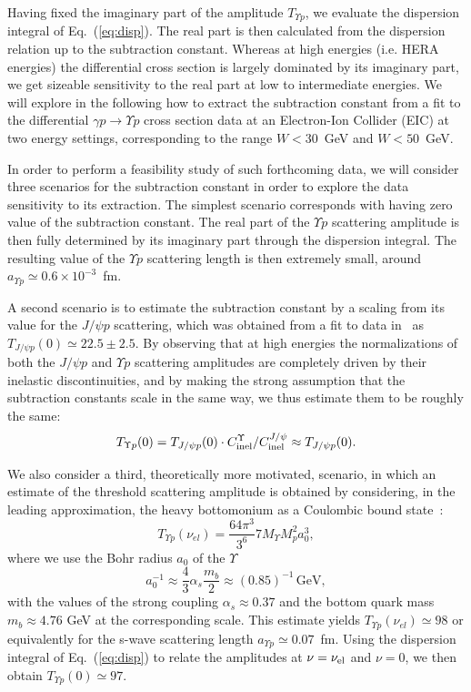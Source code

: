 \documentclass[10pt,prd,aps,nofootinbib,superscriptaddress]{revtex4}
\newcommand{\beq}{\begin{equation}}
\newcommand{\eeq}{\end{equation}}
\begin{document}
Having fixed the imaginary part of the amplitude $T_{\Upsilon p}$, we evaluate the dispersion integral of Eq.~(\ref{eq:disp}). 
The real part is then calculated from the dispersion relation up to the subtraction constant. 
Whereas at high energies (i.e. HERA energies) the differential cross section is largely dominated by its imaginary part, we get sizeable sensitivity to the real part at low to intermediate energies. We will explore in the following how to extract the subtraction constant from a fit to the 
 differential $\gamma p \to \Upsilon p$ cross section data at an Electron-Ion Collider (EIC) at two energy settings, corresponding to the range $W < 30$~GeV and $W < 50$~GeV.    

In order to perform a feasibility study of such forthcoming data, we will consider three scenarios for the subtraction constant in order to 
explore the data sensitivity to its extraction. 
The simplest scenario corresponds with having zero value of the subtraction constant. The real part of the $\Upsilon p$ scattering amplitude is then fully determined by its imaginary part through the dispersion integral. The resulting value of the $\Upsilon p$ scattering length is then extremely small, around $a_{\Upsilon p} \simeq 0.6 \times 10^{-3}$~fm. 

A second scenario is to estimate the subtraction constant by a scaling from its value for the $J/\psi p$ scattering, which was obtained from a fit to data in~\cite{Gryniuk:2016mpk} as $T_{J/\psi p }(0) \simeq 22.5 \pm 2.5$. 
By observing that at high energies the normalizations of both the $J/\psi p$ and $\Upsilon p$ scattering amplitudes are completely driven by their inelastic discontinuities, and by making the strong assumption that the subtraction constants scale in the same way, %
we thus estimate them to be roughly the same:
\beq
T_{\Upsilon p}(0) = T_{J/\psi p }(0) \cdot C_{\rm inel}^\Upsilon / C_{\rm inel}^{J/\psi} \approx T_{J/\psi p }(0).
\eeq

We also consider a third, theoretically more motivated, scenario, in which an estimate of the threshold scattering amplitude 
is obtained by considering, in the leading approximation,  the heavy bottomonium 
as a Coulombic bound state~\cite{Peskin:1979va, Kaidalov:1992hd}:
\beq
T_{\Upsilon p}(\nu_{el}) = \frac{64\pi^3}{3^6}7 M_{\Upsilon} M_p^2 a_0^3 ,
\eeq
where we use the Bohr radius $a_0$ of the $\Upsilon$
\beq
a_0^{-1} \approx \frac{4}{3}\alpha_s \frac{m_b}{2} \approx (0.85)^{-1} \,\mathrm{GeV},
\eeq
with the values of the strong coupling $\alpha_s\approx 0.37$ and the bottom quark mass $m_b\approx 4.76$ GeV at the corresponding scale.
This estimate yields $T_{\Upsilon p}(\nu_{el}) \simeq 98$ or equivalently for the s-wave scattering length $a_{\Upsilon p} \simeq 0.07$~fm. Using the dispersion integral of Eq.~(\ref{eq:disp}) to relate the amplitudes at $\nu = \nu_{\rm el}$ and $\nu = 0$, we then obtain 
$T_{\Upsilon p}(0) \simeq 97$. 
\end{document}
